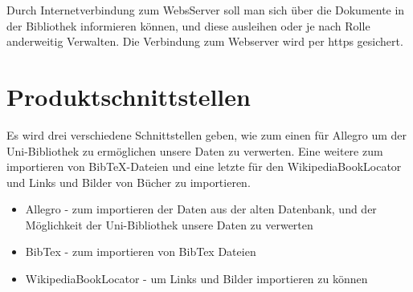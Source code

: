 Durch Internetverbindung zum WebsServer soll man sich über die Dokumente in der Bibliothek informieren können, und 
diese ausleihen oder je nach Rolle anderweitig Verwalten. Die Verbindung zum Webserver wird per https  gesichert. 



\section{Produktschnittstellen}

Es wird drei verschiedene Schnittstellen geben, wie zum einen für Allegro um der Uni-Bibliothek zu ermöglichen unsere Daten zu verwerten.
Eine weitere zum importieren von BibTeX-Dateien und eine letzte für den WikipediaBookLocator und Links und Bilder von Bücher zu importieren.

\begin{itemize}
\item Allegro - zum importieren der Daten aus der alten Datenbank, und der Möglichkeit der Uni-Bibliothek unsere Daten zu verwerten
\item BibTex - zum importieren von BibTex Dateien
\item WikipediaBookLocator - um Links und Bilder importieren zu können
\end{itemize}


